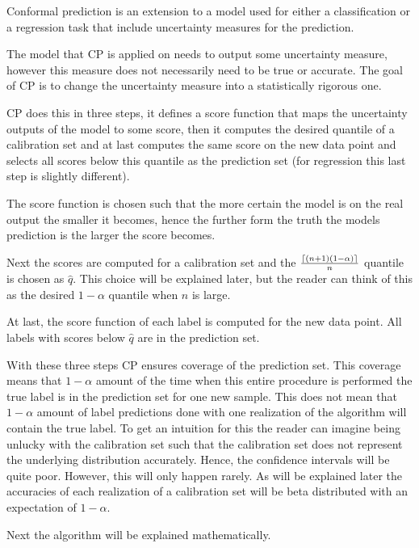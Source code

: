 Conformal prediction is an extension to a model used for either a classification or a regression task that include uncertainty measures for the prediction. %

The model that CP is applied on needs to output some uncertainty measure, however this measure does not necessarily need to be true or accurate. The goal of CP is to change the uncertainty measure into a statistically rigorous one. 

CP does this in three steps, it defines a score function that maps the uncertainty outputs of the model to some score, then it computes the desired quantile of a calibration set and at last computes the same score on the new data point and selects all scores below this quantile as the prediction set (for regression this last step is slightly different). 

The score function is chosen such that the more certain the model is on the real output the smaller it becomes, hence the further form the truth the models prediction is the larger the score becomes. 

Next the scores are computed for a calibration set and the $\frac{\lceil {(n+1)(1 - \alpha)} \rceil}{n}$ quantile is chosen as $\hat{q}$. This choice will be explained later, but the reader can think of this as the desired $1 - \alpha$ quantile when $n$ is large. 

At last, the score function of each label is computed for the new data point. All labels with scores below $\hat{q}$ are in the prediction set. 

With these three steps CP ensures coverage of the prediction set. This coverage means that $1 - \alpha$ amount of the time when this entire procedure is performed the true label is in the prediction set for one new sample. This does not mean that $1 - \alpha$ amount of label predictions done with one realization of the algorithm will contain the true label. To get an intuition for this the reader can imagine being unlucky with the calibration set such that the calibration set does not represent the underlying distribution accurately. Hence, the confidence intervals will be quite poor. However, this will only happen rarely. As will be explained later the accuracies of each realization of a calibration set will be beta distributed with an expectation of $1 - \alpha$. 

Next the algorithm will be explained mathematically. 
